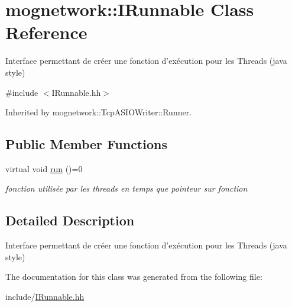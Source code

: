 \hypertarget{classmognetwork_1_1_i_runnable}{\section{mognetwork\-:\-:I\-Runnable Class Reference}
\label{classmognetwork_1_1_i_runnable}
}


Interface permettant de créer une fonction d'exécution pour les Threads (java style)  




{\ttfamily \#include $<$I\-Runnable.\-hh$>$}



Inherited by mognetwork\-::\-Tcp\-A\-S\-I\-O\-Writer\-::\-Runner.

\subsection*{Public Member Functions}
\begin{DoxyCompactItemize}
\item 
\hypertarget{classmognetwork_1_1_i_runnable_ac53515c8ecf2b2c79cb9c161fdd600d1}{virtual void \hyperlink{classmognetwork_1_1_i_runnable_ac53515c8ecf2b2c79cb9c161fdd600d1}{run} ()=0}\label{classmognetwork_1_1_i_runnable_ac53515c8ecf2b2c79cb9c161fdd600d1}

\begin{DoxyCompactList}\small\item\em fonction utilisée par les threads en temps que pointeur sur fonction \end{DoxyCompactList}\end{DoxyCompactItemize}


\subsection{Detailed Description}
Interface permettant de créer une fonction d'exécution pour les Threads (java style) 

The documentation for this class was generated from the following file\-:\begin{DoxyCompactItemize}
\item 
include/\hyperlink{_i_runnable_8hh}{I\-Runnable.\-hh}\end{DoxyCompactItemize}
